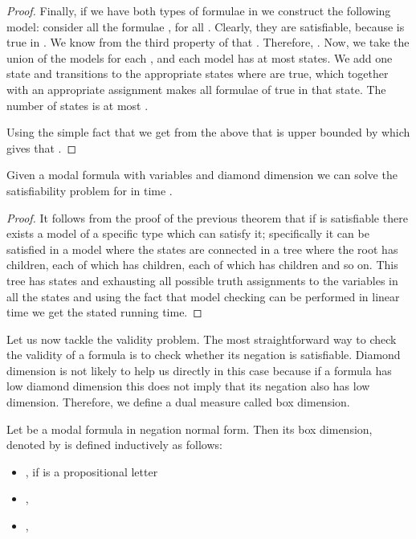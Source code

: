 \documentclass{llncs}
\begin{document}
\begin{proof}
Finally, if we have both types of formulae in  we construct the
following model: consider all the formulae , for
all . Clearly, they are satisfiable, because  is true in . We know from the third property of
 that .
Therefore, . Now, we
take the union of the models for each , and each
model has at most  states. We add one state and transitions
to the appropriate states where  are true, which
together with an appropriate assignment makes all formulae of 
true in that state. The number of states is at most .

Using the simple fact that  we get from the above that 
is upper bounded by  which gives that .


\end{proof}

\begin{corollary}

Given a modal formula  with  variables and diamond
dimension  we can solve the satisfiability problem for
 in time .

\end{corollary}

\begin{proof}

It follows from the proof of the previous theorem that if  is
satisfiable there exists a model of a specific type which can
satisfy it; specifically it can be satisfied in a model where the
states are connected in a tree where the root has  children, each
of which has  children, each of which has  children and so
on. This tree has  states and exhausting all possible truth
assignments to the variables in all the states and using the fact
that model checking can be performed in linear time we get the stated running
time.

\end{proof}



Let us now tackle the validity problem. The most straightforward way
to check the validity of a formula is to check whether its negation
is satisfiable. Diamond dimension is not likely to help us directly
in this case because if a formula has low diamond dimension this
does not imply that its negation also has low dimension. Therefore,
we define a dual measure called box dimension.

\begin{definition}

Let  be a modal formula in negation normal form. Then its box dimension,
denoted by  is defined inductively as follows:

\begin{itemize}

\item , if  is a propositional letter

\item ,


\item ,  

\end{itemize}

\end{definition}
\end{document}
